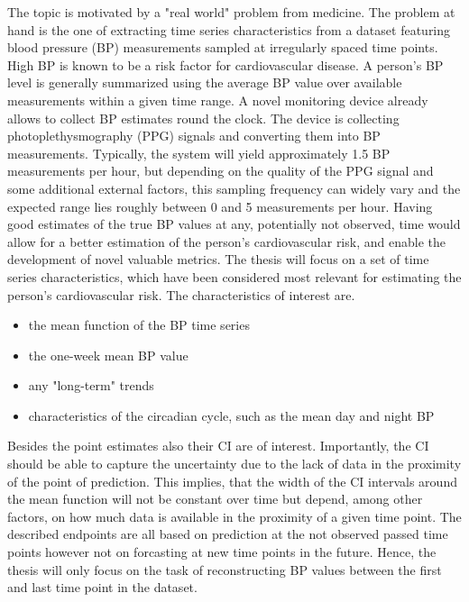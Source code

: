 The topic is motivated by a "real world" problem from medicine.
%
The problem at hand is the one of extracting time series characteristics from a dataset
featuring blood pressure (BP) measurements sampled at irregularly spaced time points.
High BP is known to be a risk factor for cardiovascular disease.
A person’s BP level is generally summarized using the average BP value over available measurements within a given time range.
A novel monitoring device already allows to collect BP estimates round the clock.
The device is collecting photoplethysmography (PPG) signals and converting them into BP measurements.
Typically, the system will yield approximately 1.5 BP measurements per hour, but depending on the quality of the PPG signal and some additional external factors,
this sampling frequency can widely vary and the expected range lies roughly between 0 and 5 measurements per hour.
Having good estimates of the true BP values at any, potentially not observed, time would allow for a better estimation
of the person’s cardiovascular risk, and enable the development of novel valuable metrics.
The thesis will focus on a set of time series characteristics, which have been considered most relevant for estimating
the person’s cardiovascular risk.
The characteristics of interest are.
\begin{itemize}
    \item the mean function of the BP time series
    \item the one-week mean BP value
    \item any "long-term" trends
    \item characteristics of the circadian cycle, such as the mean day and night BP
\end{itemize}
Besides the point estimates also their CI are of interest.
Importantly, the CI should be able to capture the uncertainty due to the lack of data in the proximity of the point of prediction.
This implies, that the width of the CI intervals around the mean function will not be constant over time but depend, among
other factors, on how much data is available in the proximity of a given time point.
The described endpoints are all based on prediction at the not observed passed time points however not on forcasting at new time points in
the future.
Hence, the thesis will only focus on the task of reconstructing BP values between the first and last time point in the dataset.

